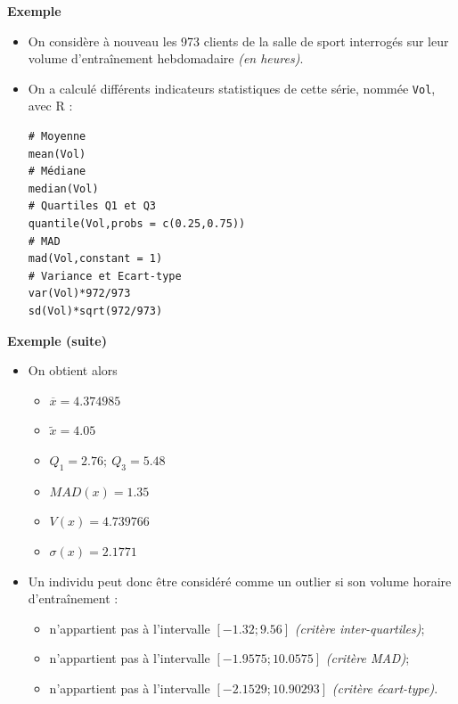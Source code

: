 \documentclass[aspectratio=169,xcolor=dvipsnames]{beamer}
\begin{document}
\begin{frame}[fragile]
	\begin{exampleblock}{\textbf{Exemple}}
		\begin{itemize}
		\item On considère à nouveau les 973 clients de la salle de sport interrogés sur leur volume d'entraînement hebdomadaire \emph{(en heures)}.
		\item On a calculé différents indicateurs statistiques de cette série, nommée \texttt{Vol}, avec \textsf{R} :
\begin{verbatim}
# Moyenne
mean(Vol)
# Médiane
median(Vol)
# Quartiles Q1 et Q3
quantile(Vol,probs = c(0.25,0.75))
# MAD
mad(Vol,constant = 1)
# Variance et Ecart-type
var(Vol)*972/973
sd(Vol)*sqrt(972/973)
\end{verbatim}
		\end{itemize}
	\end{exampleblock}
\end{frame}

\begin{frame}
	\begin{exampleblock}{\textbf{Exemple (suite)}}
	\begin{itemize}
	\item On obtient alors
		\begin{multicols}{3}
		\begin{itemize}
		\item $\overline{x} = 4.374985$
		\item $\widetilde{x} = 4.05$
		\item $Q_1 = 2.76; \ Q_3=5.48$
		\item $MAD(x) = 1.35$
		\item $V(x) = 4.739766$
		\item $\sigma(x) = 2.1771$
		\end{itemize}
	\end{multicols}
	\item Un individu peut donc être considéré comme un outlier si son volume horaire d'entraînement :
		\begin{itemize}
		\item n'appartient pas à l'intervalle $[-1.32 ; 9.56]$ \emph{(critère inter-quartiles)};
		\item n'appartient pas à l'intervalle $[-1.9575 ; 10.0575]$ \emph{(critère MAD)};
		\item n'appartient pas à l'intervalle $[-2.1529 ; 10.90293]$ \emph{(critère écart-type)}.
		\end{itemize}
	\end{itemize}
	\end{exampleblock}
\end{frame}
\end{document}
